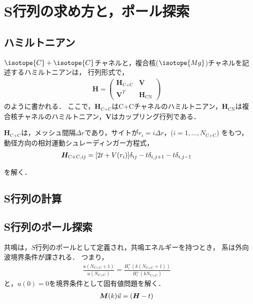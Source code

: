 \documentclass[a4paper,11pt]{ltjsarticle}
\begin{document}
\section{S行列の求め方と，ポール探索}


\subsection{ハミルトニアン}
$\isotope{C} + \isotope{C}$チャネルと，複合核($\isotope{Mg}$)チャネルを記述するハミルトニアンは，
行列形式で，
\begin{align}\label{eq:total_hamiltonian}
  \bm{H} = 
  \begin{pmatrix}
    \bm{H}_\text{C+C} & \bm{V} \\
    \bm{V}^T & \bm{H}_\text{CN}
  \end{pmatrix}
\end{align}
のように書かれる．
ここで，$\bm{H}_\text{C+C}$はC+Cチャネルのハミルトニアン，$\bm{H}_\text{CN}$は複合核チャネルのハミルトニアン，$\bm{V}$はカップリング行列である．

$\bm{H}_\text{C+C}$は，メッシュ間隔$\Delta r$であり，サイトが$r_i = i \Delta r$，($i = 1, \dots , N_\text{C+C}$)
をもつ，動径方向の相対運動シュレーディンガー方程式，
\begin{align}\label{eq:entrance_hamiltonian}
  \bm{H}_{\text{C+C}, ij} = \qty[2t + V(r_i)]\delta_{ij} - t\delta_{i, j+1} - t\delta_{i,j-1}
\end{align}

を解く．


\subsection{S行列の計算}

\subsection{S行列のポール探索}
共鳴は，$S$行列のポールとして定義され，共鳴エネルギーを持つとき，
系は外向波境界条件が課される．
つまり，
\begin{align}
  \frac{u(N_\text{C+C} + 1) }{ u(N_\text{C+C})}= \frac{H_l^+(k (N_\text{C+C} + 1)) }{ H_l^+(k N_\text{C+C})}
\end{align}
と，$u(0) = 0$を境界条件として固有値問題を解く．
\begin{align}
  \bm{M}(k) \vec{u} = \qty(\bm{H} - t )
\end{align}





















\newpage
% 
% 
\printbibliography%
\end{document}
